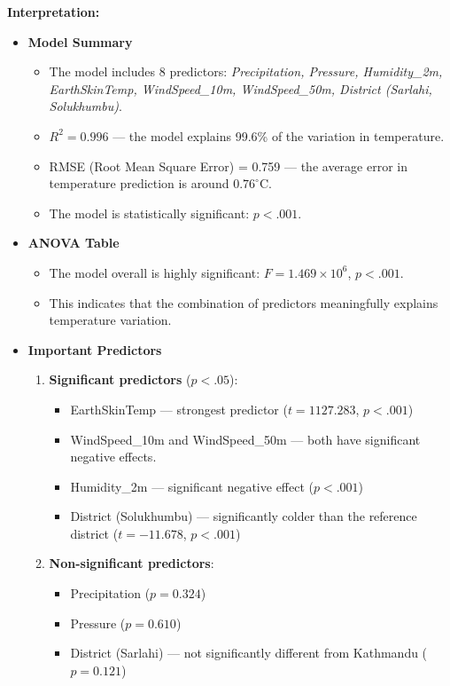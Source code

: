 \textbf{Interpretation:}
\begin{itemize}
    \item \textbf{Model Summary}
    \begin{itemize}
        \item The model includes 8 predictors: \textit{Precipitation, Pressure, Humidity\_2m, EarthSkinTemp, WindSpeed\_10m, WindSpeed\_50m, District (Sarlahi, Solukhumbu)}.
        \item $R^2 = 0.996$ — the model explains 99.6\% of the variation in temperature.
        \item RMSE (Root Mean Square Error) = 0.759 — the average error in temperature prediction is around $0.76^\circ$C.
        \item The model is statistically significant: $p < .001$.
    \end{itemize}
    \item \textbf{ANOVA Table}
    \begin{itemize}
        \item The model overall is highly significant: $F = 1.469 \times 10^6$, $p < .001$.
        \item This indicates that the combination of predictors meaningfully explains temperature variation.
    \end{itemize}

    \item \textbf{Important Predictors}
    \begin{enumerate}
        \item \textbf{Significant predictors} ($p < .05$):
        \begin{itemize}
            \item EarthSkinTemp — strongest predictor ($t = 1127.283$, $p < .001$)
            \item WindSpeed\_10m and WindSpeed\_50m — both have significant negative effects.
            \item Humidity\_2m — significant negative effect ($p < .001$)
            \item District (Solukhumbu) — significantly colder than the reference district ($t = -11.678$, $p < .001$)
        \end{itemize}
        \item \textbf{Non-significant predictors}:
        \begin{itemize}
            \item Precipitation ($p = 0.324$)
            \item Pressure ($p = 0.610$)
            \item District (Sarlahi) — not significantly different from Kathmandu ($p = 0.121$)
        \end{itemize}
    \end{enumerate}
\end{itemize}

